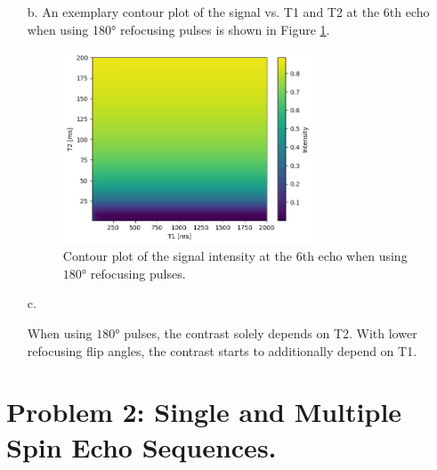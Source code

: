 \documentclass{article}
\begin{document}
\begin{itemize}
\begin{itemize}
        \end{itemize}

    \item[b.] An exemplary contour plot of the signal vs. T1 and T2 at the 6th echo when using 180° refocusing pulses is shown in Figure \ref{fig:1_b}. %
    
    \begin{figure}[]
        \centering
        \includegraphics[width=0.7\textwidth]{figures/1_b.png}
        \caption{Contour plot of the signal intensity at the 6th echo when using $180$° refocusing pulses.}
        \label{fig:1_b}
    \end{figure}
    
    \item[c.] %
    
    When using $180$° pulses, the contrast solely depends on T2. With lower refocusing flip angles, the contrast starts to additionally depend on T1. 

\end{itemize}

\section*{Problem 2: Single and Multiple Spin Echo Sequences.}
\end{document}

